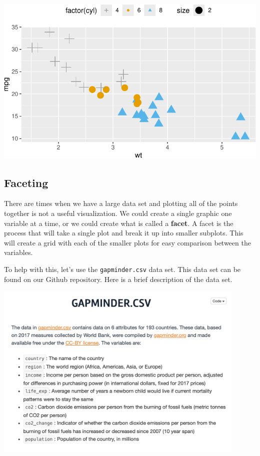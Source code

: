 \documentclass[
  letterpaper,
  DIV=11,
  numbers=noendperiod]{scrreprt}
\begin{document}
\includegraphics{Advanced_Scatterplot_Techniques_files/figure-pdf/unnamed-chunk-12-1.pdf}

\subsection*{Faceting}\label{faceting}

There are times when we have a large data set and plotting all of the
points together is not a useful visualization. We could create a single
graphic one variable at a time, or we could create what is called a
\textbf{facet}. A facet is the process that will take a single plot and
break it up into smaller subplots. This will create a grid with each of
the smaller plots for easy comparison between the variables.

To help with this, let's use the \texttt{gapminder.csv} data set. This
data set can be found on our Github repository. Here is a brief
description of the data set.

\includegraphics[width=0.9\textwidth,height=\textheight]{./images/AST_3.jpg}
\end{document}
